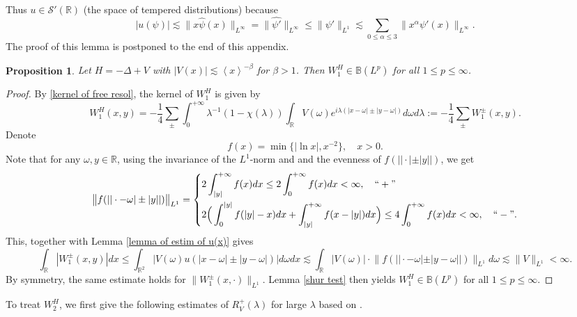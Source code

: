 \documentclass[reqno]{amsart}
\newtheorem{proposition}[definition]{Proposition}
\newcommand\R{\mathbb{R}}
\newcommand\B{\mathbb{B}}
\newcommand\mcaS{\mathcal{S}}
\numberwithin{equation}{section}
\begin{document}
Thus $u\in \mcaS'(\R)$ (the space of tempered distributions) because
\begin{equation*}
|u(\psi)|\lesssim\big\|x\hat{\psi}(x)\big\|_{L^{\infty}}=\big\|\hat{\psi'}\big\|_{L^{\infty}}\leq \|\psi'\|_{L^1}\lesssim \sum\limits_{0\leq\alpha\leq3}\|x^{\alpha}\psi'(x)\|_{L^{\infty}}.
\end{equation*}
The proof of this lemma is postponed to the end of this appendix.
\begin{proposition}\label{bound of W1}
Let $H=-\Delta+V$ with $|V(x)|\lesssim \left<x\right>^{-\beta}$ for $\beta>1$. Then $W^{H}_1\in\B(L^p)$ for all $1\leq p\leq\infty$.
\end{proposition}
\begin{proof}
By \eqref{kernel of free resol}, the kernel of $W^H_1$ is given by 
\begin{equation*}
    W^{H}_{1}(x,y)=-\frac{1}{4}\sum\limits_{\pm}\int_{0}^{+\infty}\lambda^{-1}(1-\chi(\lambda)) \int_{\R}V(\omega)e^{i\lambda(|x-\omega|\pm|y-\omega|)}d\omega d\lambda:=-\frac{1}{4}\sum\limits_{\pm}W^{\pm}_1(x,y).
\end{equation*}
Denote 
\begin{equation*}
    f(x)=\min\{|\ln x|,x^{-2}\},\quad x>0.
\end{equation*}
Note that for any $\omega,y\in\R$, using the invariance of the $L^1$-norm and and the evenness of $f(||\cdot|\pm|y||)$, we get
\begin{equation*}
\big\|f(||\cdot-\omega|\pm|y||)\big\|_{L^1}=\left\{\begin{aligned}
&2\int_{|y|}^{+\infty}f(x)dx\leq 2\int_{0}^{+\infty}f(x)dx<\infty,\quad ``+"\\
&2\Big(\int_{0}^{|y|}f(|y|-x)dx+\int_{|y|}^{+\infty}f(x-|y|)dx\Big)\leq 4\int_{0}^{+\infty}f(x)dx<\infty, \quad ``-".
\end{aligned}\right.
\end{equation*}
This, together with Lemma \ref{lemma of estim of u(x)} gives  
\begin{equation*}
\int_{\R}|W^{\pm}_1(x,y)|dx\leq \int_{\R^2}\big|V(\omega)u(|x-\omega|\pm|y-\omega|)\big|d\omega dx \lesssim\int_{\R}|V(\omega)|\cdot\big\|f(||\cdot-\omega|\pm|y-\omega||)\big\|_{L^1}d\omega\lesssim\|V\|_{L^1}<\infty.
\end{equation*}
By symmetry, the same estimate holds for $\|W^{\pm}_1(x,\cdot)\|_{L^1}$. Lemma \ref{shur test} then yields $W^H_1\in\B(L^p)$ for all $1\leq p\leq\infty$. 
\end{proof}
To treat $W^H_2$, we first give the following estimates of $R^+_V(\lambda)$ for large $\lambda$ based on \cite[Lemma 3.9]{FSWY20}. 
\end{document}
